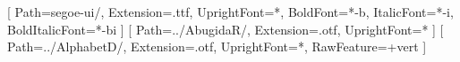 \setmainfont{segoe-ui}[
	Path=segoe-ui/,
	Extension=.ttf,
	UprightFont=*,
	BoldFont=*-b,
	ItalicFont=*-i,
	BoldItalicFont=*-bi
]
\newfontfamily{}[
	Path=../AbugidaR/,
	Extension=.otf,
	UprightFont=*
]
\newenvironment{AbRBlock}{\AbugidaR}{}
\newfontfamily{}[
	Path=../AlphabetD/,
	Extension=.otf,
	UprightFont=*,
	RawFeature={+vert}
]
\newenvironment{AlDBlock}{\AlphabetD}{}
\makeglossaries

